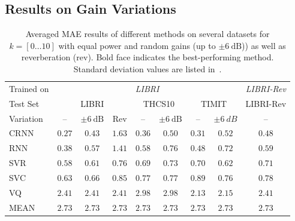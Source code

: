 \subsection{Results on Gain Variations}%
\label{ssec:exp_random_gains}
%
\begin{table}[t]
\scriptsize

\begin{center}
\begin{tabular}{lcccccccc}
\toprule
Trained on & \multicolumn{7}{c}{\emph{LIBRI}} & \multicolumn{1}{c}{\emph{LIBRI-Rev}} \\
\cmidrule(r){2-8} \cmidrule(r){9-9}
Test Set & \multicolumn{3}{c}{LIBRI} & \multicolumn{2}{c}{THCS10} & \multicolumn{2}{c}{TIMIT} & \multicolumn{1}{c}{LIBRI-Rev} \\
\cmidrule(r){2-4} \cmidrule(r){5-6} \cmidrule(r){7-8} \cmidrule(r){9-9}
Variation &     – &     $\pm 6~\mbox{dB}$ & Rev &  – &     $\pm 6~\mbox{dB}$ &     – &  $\pm 6~dB$ & – \\
\midrule
CRNN    &  $\mathbf{0.27}$ & $\mathbf{0.43}$ & $1.63$ & $\mathbf{0.36}$  & $\mathbf{0.50}$ & $\mathbf{0.31}$ & $\mathbf{0.52}$  &  $\mathbf{0.48}$\\
RNN~\cite{stoeter17} & $0.38$ & $0.57$ & $1.41$ & $0.58$ &$0.76$ & $0.48$ & $0.72$ & $0.59$\\
SVR     &  $0.58$ & $0.61$ & $\mathbf{0.76}$ & $0.69$ &  $0.73$ & $0.70$ & $0.62$ & $0.71$ \\
SVC     &  $0.63$ & $0.66$ & $0.85$ & $0.77$ &  $0.77$ & $0.89$ & $0.76$ & $0.78$ \\
VQ \cite{sayoud10} &  $2.41$ & $2.41$ & $2.41$ & $2.98$ &  $2.98$ & $2.13$ & $2.15$ & $2.41$ \\
MEAN    &  $2.73$ & $2.73$ & $2.73$ & $2.73$ &  $2.73$ & $2.73$ & $2.73$ & $2.73$ \\
\bottomrule
\end{tabular}
\end{center}
\caption{Averaged MAE results of different methods on several datasets for \( k = [0 \ldots 10] \) with equal power and random gains (up to $\pm 6~\mbox{dB}$)) as well as reverberation (rev). Bold face indicates the best-performing method. Standard deviation values are listed in~\cite{stoeter19}.}
\label{tab:expgainreverb}
\end{table}

